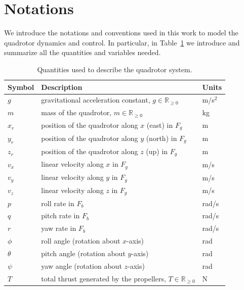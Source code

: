 \section{Notations}
We introduce the notations and conventions used in this work 
to model the quadrotor dynamics and control. 
In particular, in Table~\ref{tab:notations} we introduce and 
summarize all the quantities and variables needed.
\begin{table}[h!]
    \centering
    \begin{tabular}{lll}
        \hline
        Symbol & Description & Units \\
        \hline
        \(g\) & gravitational acceleration constant, \( g \in \mathbb{R}_{\geq 0} \) & m/s\(^2\) \\
        \(m\) & mass of the quadrotor, \( m \in \mathbb{R}_{\geq 0} \) & kg \\
        \(x_r\) & position of the quadrotor along \(x\) (east) in \(F_g\) & m \\
        \(y_r\) & position of the quadrotor along \(y\) (north) in \(F_g\) & m \\
        \(z_r\) & position of the quadrotor along \(z\) (up) in \(F_g\) & m \\
        \(v_x\) & linear velocity along \(x\) in \(F_g\) & m/s \\
        \(v_y\) & linear velocity along \(y\) in \(F_g\) & m/s \\
        \(v_z\) & linear velocity along \(z\) in \(F_g\) & m/s \\
        \(p\) & roll rate in \(F_b\) & rad/s \\
        \(q\) & pitch rate in \(F_b\) & rad/s \\
        \(r\) & yaw rate in \(F_b\) & rad/s \\
        \(\phi\) & roll angle (rotation about \(x\)-axis) & rad \\
        \(\theta\) & pitch angle (rotation about \(y\)-axis) & rad \\
        \(\psi\) & yaw angle (rotation about \(z\)-axis) & rad \\
        \(T\) & total thrust generated by the propellers, \( T \in \mathbb{R}_{\geq 0} \) & N \\
        \hline
    \end{tabular}
    \caption{Quantities used to describe the quadrotor system.}
    \label{tab:notations}
\end{table}


